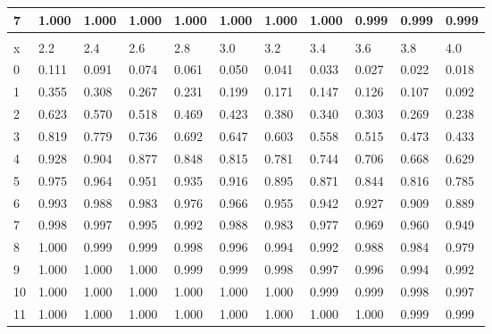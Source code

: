\documentclass[1pt]{report}
\newcommand{\<}{\langle}
\renewcommand{\>}{\rangle}
\begin{document}
\begin{table}[H]
{{{\begin{tabular}{| l | l l l l l l l l l l|}
7 & 1.000 & 1.000 & 1.000 & 1.000 & 1.000 & 1.000 & 1.000 & 0.999 & 0.999 & 0.999\\
 \hline
\multicolumn{11}{c}{ }\\ \hline
x & 2.2 & 2.4 & 2.6 & 2.8 & 3.0 & 3.2 & 3.4 & 3.6 & 3.8 & 4.0\\ \hline\hline
0 & 0.111 & 0.091 & 0.074 & 0.061 & 0.050 & 0.041 & 0.033 & 0.027 & 0.022 & 0.018\\
1 & 0.355 & 0.308 & 0.267 & 0.231 & 0.199 & 0.171 & 0.147 & 0.126 & 0.107 & 0.092\\
2 & 0.623 & 0.570 & 0.518 & 0.469 & 0.423 & 0.380 & 0.340 & 0.303 & 0.269 & 0.238\\
3 & 0.819 & 0.779 & 0.736 & 0.692 & 0.647 & 0.603 & 0.558 & 0.515 & 0.473 & 0.433\\
4 & 0.928 & 0.904 & 0.877 & 0.848 & 0.815 & 0.781 & 0.744 & 0.706 & 0.668 & 0.629\\
5 & 0.975 & 0.964 & 0.951 & 0.935 & 0.916 & 0.895 & 0.871 & 0.844 & 0.816 & 0.785\\
6 & 0.993 & 0.988 & 0.983 & 0.976 & 0.966 & 0.955 & 0.942 & 0.927 & 0.909 & 0.889\\
7 & 0.998 & 0.997 & 0.995 & 0.992 & 0.988 & 0.983 & 0.977 & 0.969 & 0.960 & 0.949\\
8 & 1.000 & 0.999 & 0.999 & 0.998 & 0.996 & 0.994 & 0.992 & 0.988 & 0.984 & 0.979\\
9 & 1.000 & 1.000 & 1.000 & 0.999 & 0.999 & 0.998 & 0.997 & 0.996 & 0.994 & 0.992\\
10 & 1.000 & 1.000 & 1.000 & 1.000 & 1.000 & 1.000 & 0.999 & 0.999 & 0.998 & 0.997\\
11 & 1.000 & 1.000 & 1.000 & 1.000 & 1.000 & 1.000 & 1.000 & 1.000 & 0.999 & 0.999\\ \hline
\end{tabular}}
}}
\end{table}
\end{document}
